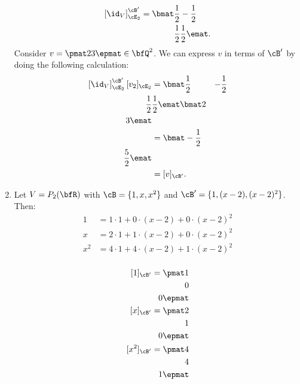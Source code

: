 \begin{example}
\begin{enumerate}[label = (\arabic*)]
                \begin{equation*}
                \begin{split}
                    \left[ \id_V \right]_{\cE_2}^{\cB'} = \bmat \frac{1}{2} & -\frac{1}{2} \\ \frac{1}{2} & \frac{1}{2} \emat.
                \end{split}
                \end{equation*}
            Consider $v = \pmat 2 \\ 3 \epmat \in \bfQ^2$. We can express $v$ in terms of $\cB'$ by doing the following calculation:
                \begin{equation*}
                \begin{split}
                    \left[ \id_V \right]_{\cE_2}^{\cB'}[v_2]_{\cE_2}
                    & = \bmat \frac{1}{2} & -\frac{1}{2} \\ \frac{1}{2} & \frac{1}{2} \emat \bmat 2 \\ 3 \emat \\
                    & = \bmat -\frac{1}{2} \\ \frac{5}{2} \emat \\
                    & = [v]_{\cB'}.
                \end{split}
                \end{equation*}
            
            \item Let $V = P_2(\bfR)$ with $\cB = \{1,x,x^2\}$ and $\cB' = \{1,(x-2),(x-2)^2\}$. Then:
                \begin{equation*}
                \begin{split}
                    1 &= 1 \cdot 1 + 0 \cdot (x-2) + 0 \cdot (x-2)^2 \\
                    x &= 2 \cdot 1 + 1 \cdot (x-2) + 0 \cdot (x-2)^2 \\
                    x^2 &= 4 \cdot 1 + 4 \cdot (x-2) + 1 \cdot (x-2)^2 \\
                \end{split}
                \end{equation*}

                \begin{equation*}
                \begin{split}
                    [1]_{\cB'} =  \pmat 1 \\ 0 \\ 0\epmat\\
                    [x]_{\cB'} = \pmat 2 \\ 1 \\ 0\epmat\\
                    [x^2]_{\cB'} = \pmat 4 \\ 4 \\ 1\epmat
                \end{split}
                \end{equation*}


\end{enumerate}
\end{example}
